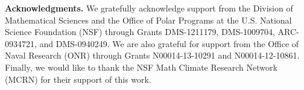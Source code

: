 \documentclass[leqno,onefignum,onetabnum]{siamltex1213}
\begin{document}
\medskip

{\bf Acknowledgments.}
We gratefully acknowledge support from the Division of Mathematical
  Sciences and the Office of Polar Programs at the U.S. National
  Science Foundation (NSF) through Grants DMS-1211179, DMS-1009704,
  ARC-0934721, and DMS-0940249. We are also grateful for support from
  the Office of Naval Research (ONR) through Grants N00014-13-10291 and
  N00014-12-10861. Finally, we would like to thank the NSF Math Climate
  Research Network (MCRN) for their support of this work. 


\medskip









\end{document}
